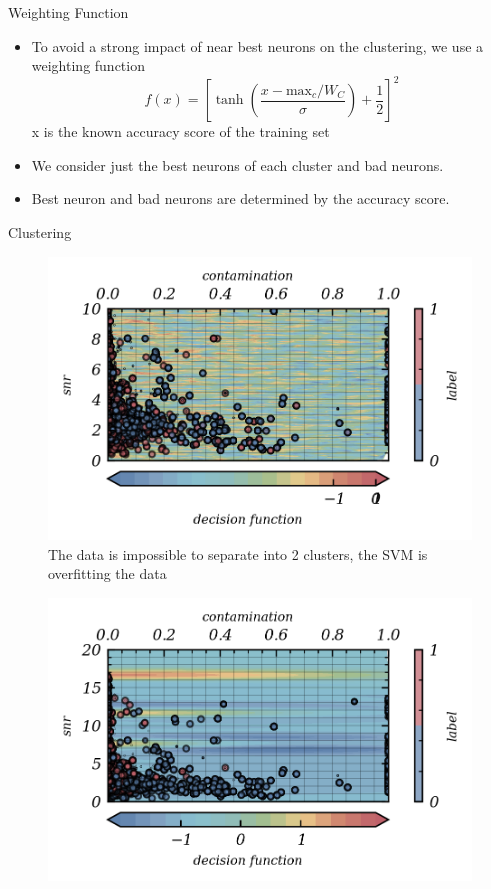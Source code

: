 \documentclass[numbering=fraction]{beamer}
\begin{document}
\begin{frame}{Weighting Function}
    \begin{itemize}
        \item To avoid a strong impact of near best neurons on the clustering, we use a weighting function
              $$f(x) = \left[\tanh \left( \frac{x - \text{max}_c /W_C}{\sigma} \right) + \frac{1}{2} \right]^2$$
              x is the known accuracy score of the training set
        \item We consider just the best neurons of each cluster and bad neurons.
        \item Best neuron and bad neurons are determined by the accuracy score.
    \end{itemize}
\end{frame}
\begin{frame}{Clustering}
    \begin{minipage}{.48\textwidth}
        \begin{figure}[H]
            \centering
            \includegraphics[width=1\linewidth]{./figure/decision_function_working_2.png}
            \caption{\scriptsize{The data is impossible to separate into 2 clusters, the SVM is overfitting the data}}
            \label{}
        \end{figure}
    \end{minipage}
    \begin{minipage}{.48\textwidth}
        \begin{figure}[H]
            \centering
            \includegraphics[width=1\linewidth]{./figure/decision_function_working_3.png}

\end{figure}
\end{minipage}
\end{frame}
\end{document}
